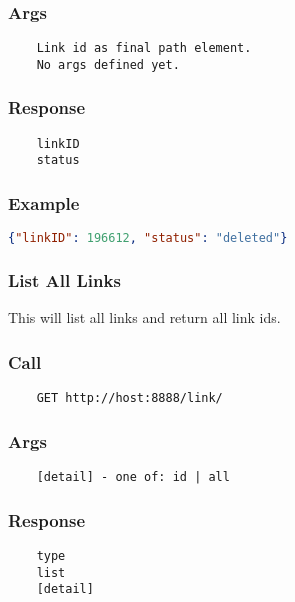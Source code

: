 \subsubsection*{Args}
\begin{verbatim}
	Link id as final path element.
	No args defined yet.
\end{verbatim}

\subsubsection*{Response}
\begin{verbatim}
	linkID
	status
\end{verbatim}

\subsubsection*{Example}
\begin{lstlisting}[language=json]
{"linkID": 196612, "status": "deleted"}
\end{lstlisting}

\hr
\subsubsection{List All Links}
This will list all links and return all link ids.
\subsubsection*{Call}
\begin{verbatim}
	GET http://host:8888/link/
\end{verbatim}

\subsubsection*{Args}
\begin{verbatim}
	[detail] - one of: id | all
\end{verbatim}

\subsubsection*{Response}
\begin{verbatim}
	type
	list
	[detail]
\end{verbatim}

